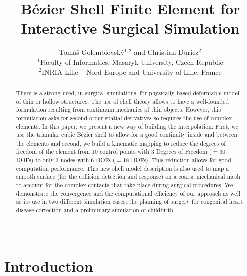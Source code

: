 \documentclass{egpubl}
\title[B\'ezier Shell FE]%
      {B\'ezier Shell Finite Element for Interactive Surgical Simulation}
\author[T. Golembiovský \& C. Duriez]
       {Tomáš Golembiovský$^{1,2}$ and Christian Duriez$^{2}$\\
        $^1$Faculty of Informatics, Masaryk University, Czech Republic\\
        $^2$INRIA Lille -- Nord Europe and University of Lille, France
       }
\begin{document}

\maketitle

\begin{abstract}
There is a strong need, in surgical simulations, for physically based deformable model of thin or hollow structures.
The use of shell theory allows to have a well-founded formulation resulting from continuum mechanics of thin objects.
However, this formulation asks for second order spatial derivatives so requires the use of complex elements.
In this paper, we present a new way of building the interpolation:
First, we use the trianular cubic B\'ezier shell to allow for a good continuity inside and between the elements and second, we build a kinematic mapping to reduce the degrees of freedom of the element from 10 control points with 3 Degrees of Freedom ($=30$ DOFs) to only 3 nodes with 6 DOFs ($=18$ DOFs).
This reduction allows for good computation performance.
This new shell model description is also used to map a smooth surface (for the collision detection and response) on a coarse mechanical mesh to account for the complex contacts that take place during surgical procedures.
We demonstrate the convergence and the computational efficiency of our approach as well as its use in two different simulation cases: the planning of surgery for congenital heart disease correction and a preliminary simulation of childbirth.

\begin{classification} %
    .
\end{classification}

\end{abstract}






\section{Introduction} %
\end{document}
